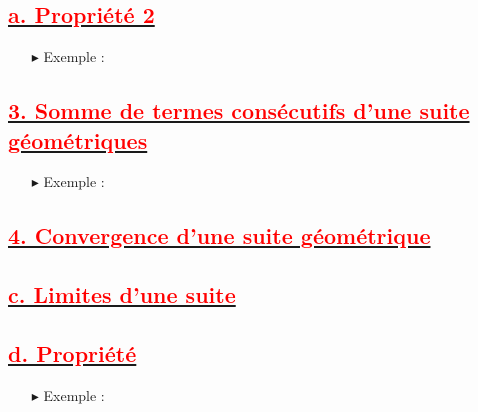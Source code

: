 \documentclass[12pt]{article}
\begin{document}
\subsection*{\underline{\textbf{\textcolor{red}{a. Propriété 2}}}}
\begin{itemize}
\item[$\blacktriangleright$] Exemple :
\end{itemize}
\subsection*{\underline{\textbf{\textcolor{red}{3. Somme de termes consécutifs d’une suite géométriques}}}}
\begin{itemize}
\item[$\blacktriangleright$] Exemple :
\end{itemize}
\subsection*{\underline{\textbf{\textcolor{red}{4. Convergence d’une suite géométrique}}}}
\subsection*{\underline{\textbf{\textcolor{red}{c. Limites d’une suite}}}}
\subsection*{\underline{\textbf{\textcolor{red}{d. Propriété}}}}
\begin{itemize}
\item[$\blacktriangleright$] Exemple :
\end{itemize}
\end{document}
